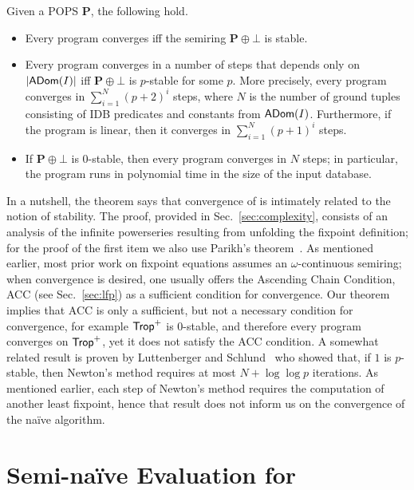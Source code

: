 \begin{thm} \label{th:main:intro} Given a POPS $\bm P$, the following hold.
  \begin{itemize}
  \item Every \datalogo program converges iff the semiring $\bm P\oplus \bot$ is stable.
  \item Every program converges in a number of steps that depends only
    on $|\textsf{ADom}(I)|$ iff $\bm P \oplus \bot$ is $p$-stable for some
    $p$.  More precisely, every \datalogo program converges in
    $\sum_{i=1}^{N}(p+2)^i$ steps, where $N$ is the number of ground
    tuples consisting of IDB predicates and constants from $\textsf{ADom}(I)$.
    Furthermore, if the program is linear, then it converges in $\sum_{i=1}^N(p+1)^i$ steps.
  \item If $\bm P\oplus \bot$ is $0$-stable, then every \datalogo
    program converges in $N$ steps; in particular, the program runs in
    polynomial time in the size of the input database.
  \end{itemize}
\end{thm}

In a nutshell, the theorem says that convergence of \datalogo is
intimately related to the notion of stability.  The proof, provided in
Sec.~\ref{sec:complexity}, consists of an analysis of the infinite
powerseries resulting from unfolding the fixpoint definition; for
the proof of the first item we also use Parikh's
theorem~\cite{MR209093}.  As mentioned earlier, most prior work on
fixpoint equations assumes an $\omega$-continuous semiring; when
convergence is desired, one usually offers the Ascending Chain
Condition, ACC (see Sec.~\ref{sec:lfp}) as a sufficient condition for
convergence.  Our theorem implies that ACC is only a sufficient, but
not a necessary condition for convergence, for example $\text{\sf Trop}^+$ is
$0$-stable, and therefore every \datalogo program converges on
$\text{\sf Trop}^+$, yet it does not satisfy the ACC condition.  A somewhat
related result is proven by Luttenberger and
Schlund~\cite{DBLP:journals/iandc/LuttenbergerS16} who showed that, if
$1$ is $p$-stable, then Newton's method requires at most
$N + \log\log p$ iterations.  As mentioned earlier, each step of
Newton's method requires the computation of another least fixpoint,
hence that result does not inform us on the convergence of the na\"ive
algorithm.

\section{Semi-na\"ive Evaluation for \datalogo}
\label{sec:semi-naive}
